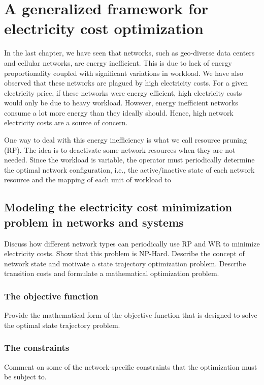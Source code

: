 \chapter{A generalized framework for electricity cost optimization}
\label{chap:framework} In the last chapter, we have seen that networks, such as geo-diverse data centers and cellular networks, are energy inefficient. This is due to lack of energy proportionality coupled with significant variations in workload. We have also observed that these networks are plagued by high electricity costs. For a given electricity price, if these networks were energy efficient, high electricity costs would only be due to heavy workload. However, energy inefficient networks consume a lot more energy than they ideally should. Hence, high network electricity costs are a source of concern. 

One way to deal with this energy inefficiency is what we call resource pruning (RP). The idea is to deactivate some network resources when they are not needed. Since the workload is variable, the operator must periodically determine the optimal network configuration, i.e., the active/inactive state of each network resource and the mapping of each unit of workload to 

\section{Modeling the electricity cost minimization problem in networks and systems} Discuss how different network types can periodically use RP and WR to minimize electricity costs. Show that this problem is NP-Hard. Describe the concept of network state and motivate a state trajectory optimization problem. Describe transition costs and formulate a mathematical optimization problem. 
\subsection{The objective function} Provide the mathematical form of the objective function that is designed to solve the optimal state trajectory problem.
\subsection{The constraints} Comment on some of the network-specific constraints that the optimization must be subject to.

